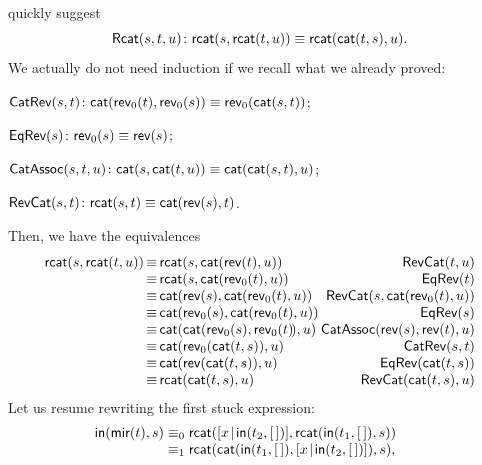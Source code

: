 quickly suggest
\begin{equation*}
  \textsf{Rcat}({s,t,u}) \colon \textsf{rcat}(s,\textsf{rcat}(t,u)) \equiv \textsf{rcat}(\textsf{cat}(t,s),u).
\end{equation*}
We actually do not need induction if we recall what we already proved:
\begin{itemize*}

  \item \(\textsf{CatRev}({s,t}) \colon \textsf{cat}(\textsf{rev}_0(t),
    \textsf{rev}_0(s)) \equiv \textsf{rev}_0(\textsf{cat}(s,t))\);

  \item \(\textsf{EqRev}({s}) \colon \textsf{rev}_0(s) \equiv \textsf{rev}(s)\);

  \item \(\textsf{CatAssoc}({s,t,u}) \colon \textsf{cat}(s,\textsf{cat}(t,u))
    \equiv \textsf{cat}(\textsf{cat}(s,t),u)\);

  \item \(\textsf{RevCat}({s,t}) \colon \textsf{rcat}(s,t) \equiv
    \textsf{cat}(\textsf{rev}(s),t)\).

\end{itemize*}
Then, we have the equivalences
\begin{equation*}
\begin{array}{@{}r@{\,}c@{\,}l@{\,}r@{}}
\fun{rcat}(s,\fun{rcat}(t,u))
& \equiv & \fun{rcat}(s,\fun{cat}(\fun{rev}(t),u))
& \IH{\pred{RevCat}{t,u}}\\
& \equiv & \fun{rcat}(s,\fun{cat}(\fun{rev}_0(t),u))
& \IH{\pred{EqRev}{t}}\\
& \equiv & \fun{cat}(\fun{rev}(s),\fun{cat}(\fun{rev}_0(t),u))
& \IH{\pred{RevCat}{s,\fun{cat}(\fun{rev}_0(t),u)}}\\
& \equiv & \fun{cat}(\fun{rev}_0(s),\fun{cat}(\fun{rev}_0(t),u))
& \IH{\pred{EqRev}{s}}\\
& \equiv & \fun{cat}(\fun{cat}(\fun{rev}_0(s),\fun{rev}_0(t)\!),u)
& \IH{\pred{CatAssoc}{\fun{rev}(s),\fun{rev}(t),u}}\\
& \equiv & \fun{cat}(\fun{rev}_0(\fun{cat}(t,s)),u)
& \IH{\pred{CatRev}{s,t}}\\
& \equiv & \fun{cat}(\fun{rev}(\fun{cat}(t,s)),u)
& \IH{\pred{EqRev}{\fun{cat}(t,s)}}\\
& \equiv & \fun{rcat}(\fun{cat}(t,s),u)
& \IH{\pred{RevCat}{\fun{cat}(t,s),u}}
\end{array}
\end{equation*}
Let us resume rewriting the first stuck expression:
\begin{equation*}
\begin{array}{@{}r@{\;}c@{\;}l@{\qquad}r@{}}
\fun{in}(\fun{mir}(t),s)
& \equiv_0
& \fun{rcat}(\cons{x}{\fun{in}(t_2,\el)},
  \fun{rcat}(\fun{in}(t_1,\el),s))\\
& \equiv_1
& \fun{rcat}(\fun{cat}(\fun{in}(t_1,\el),
  \cons{x}{\fun{in}(t_2,\el)}), s),\index{rcat@\fun{rcat/2}|)}
\end{array}
\end{equation*}
